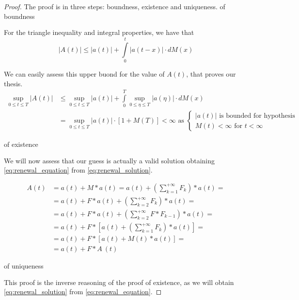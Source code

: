 \begin{proof}
	The proof is in three steps: boundness, existence and uniqueness.
	\proofpart of boundness \label{req:boundness}

	For the triangle inequality and integral properties, we have that
	$$ |A(t)| \le |a(t)| + \int\limits_0^{t}|a(t-x)| \cdot dM(x) $$

	We can easily assess this upper buond for the value of $A(t)$, that proves our thesis.
	\begin{equation}\begin{split}
		\sup_{0\le t \le T} |A(t)| & \le \sup_{0\le t \le T} |a(t)| + \int\limits_0^{T}\sup_{0\le \eta \le T}|a(\eta)| \cdot dM(x) \\
		& = \sup_{0\le t \le T} |a(t)| \cdot [ 1+M(T) ] < \infty \text{ as }
		\begin{cases}
			|a(t)| \text{ is bounded for hypothesis} \\
			M(t) < \infty \text{ for } t<\infty
		\end{cases}
	\end{split}\end{equation}

	\proofpart of existence

		We will now assess that our guess is actually a valid solution obtaining \eqref{eq:renewal_equation} from \eqref{eq:renewal_solution}.

		\begin{equation}\begin{split}
			A(t) &= a(t) + M \ast a(t) = a(t) + \left(\sum\limits_{k=1}^{+\infty} F_k \right) \ast a(t) = \\
			&= a(t) + F \ast a(t) +\left(\sum\limits_{k=2}^{+\infty} F_k \right) \ast a(t) = \\
			&= a(t) + F \ast a(t) +\left(\sum\limits_{k=2}^{+\infty} F \ast F_{k-1} \right) \ast a(t) = \\
			&= a(t) + F \ast \left[ a(t) + \left(\sum\limits_{k=1}^{+\infty} F_k \right) \ast a(t) \right] = \\
			&= a(t) + F \ast \left[ a(t) + M(t) \ast a(t) \right] = \\
			&=a(t) + F \ast A ~ (t)
		\end{split}\end{equation}

	\proofpart of uniqueness

	This proof is the inverse reasoning of the proof of existence, as we will obtain \eqref{eq:renewal_solution} from \eqref{eq:renewal_equation}.


\end{proof}
